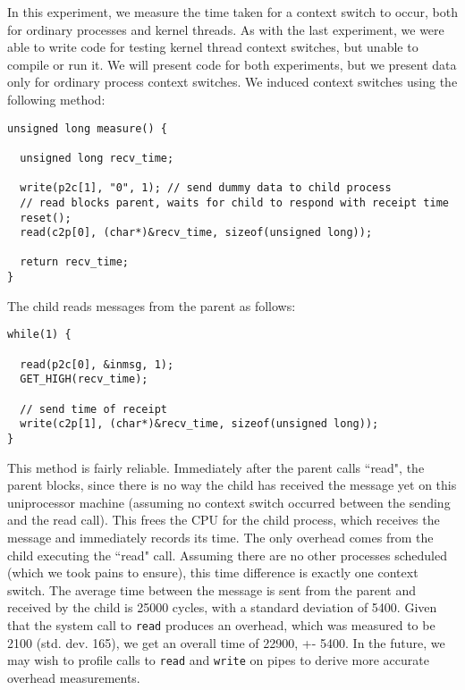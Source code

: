 In this experiment, we measure the time taken for a context switch to occur, both for ordinary processes and kernel threads. As with the last experiment, we were able to write code for testing kernel thread context switches, but unable to compile or run it. We will present code for both experiments, but we present data only for ordinary process context switches.
\newline
\newline
We induced context switches using the following method:

\noindent \begin{verbatim}
unsigned long measure() {

  unsigned long recv_time;

  write(p2c[1], "0", 1); // send dummy data to child process
  // read blocks parent, waits for child to respond with receipt time
  reset();
  read(c2p[0], (char*)&recv_time, sizeof(unsigned long)); 
  
  return recv_time;
}
\end{verbatim}

\noindent The child reads messages from the parent as follows:

\noindent \begin{verbatim}
while(1) {

  read(p2c[0], &inmsg, 1);
  GET_HIGH(recv_time);
  
  // send time of receipt
  write(c2p[1], (char*)&recv_time, sizeof(unsigned long));
}
\end{verbatim}

\noindent This method is fairly reliable. Immediately after the parent calls ``read", the parent blocks, since there is no way the child has received the message yet on this uniprocessor machine (assuming no context switch occurred between the sending and the read call). This frees the CPU for the child process, which receives the message and immediately records its time. The only overhead comes from the child executing the ``read" call. Assuming there are no other processes scheduled (which we took pains to ensure), this time difference is exactly one context switch.
\newline
\newline
The average time between the message is sent from the parent and received by the child is 25000 cycles, with a standard deviation of 5400. Given that the system call to {\tt read} produces an overhead, which was measured to be 2100 (std. dev. 165), we get an overall time of 22900, +- 5400. In the future, we may wish to profile calls to {\tt read} and {\tt write} on pipes to derive more accurate overhead measurements.


